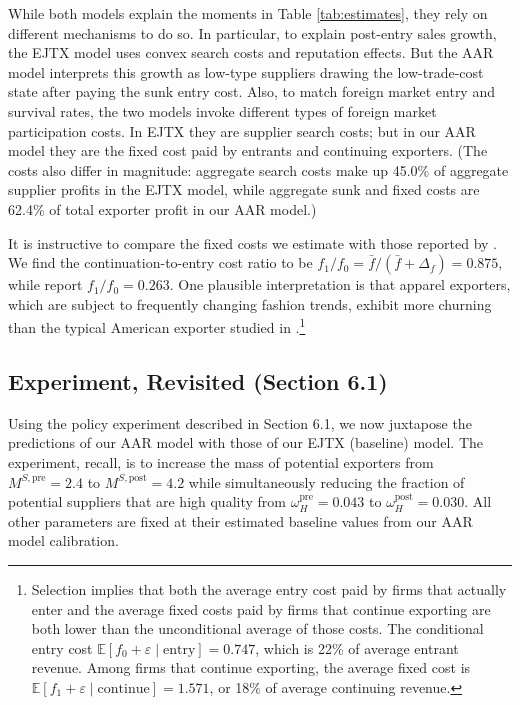 \documentclass[12pt]{article} \usepackage{amsmath,amssymb,amsthm,geometry,graphicx,setspace,algorithm,algpseudocode,float}
\begin{document}
While both models explain the moments in Table \ref{tab:estimates}, they rely on different mechanisms to do so. In particular, to explain post-entry sales growth, the EJTX model uses convex search costs and reputation effects. But the AAR model interprets this growth as low-type suppliers  drawing the low-trade-cost state after paying the sunk entry cost.
Also, to match foreign market entry and survival rates, the two models invoke different types of foreign market participation costs. 
 In EJTX they are supplier search costs; but in our AAR model they are the fixed cost paid by entrants and continuing exporters.  
(The costs also differ in magnitude: aggregate search costs make up 45.0\% of aggregate supplier profits in the EJTX model, while aggregate sunk and fixed costs are 62.4\% of total exporter profit in our AAR model.) 

 It is instructive to compare the fixed costs we estimate with those reported by \citet{AlessandriaArkolakisRuhl2020}. We find the continuation-to-entry cost ratio to be $f_1/f_0 = \bar f/(\bar f+\Delta_f)=0.875$, while \citet{AlessandriaArkolakisRuhl2020} report $f_1/f_0=0.263$. One plausible interpretation is that apparel exporters, which are subject to frequently changing fashion trends, exhibit more churning than the typical American exporter studied in \citet{AlessandriaArkolakisRuhl2020}.\footnote{Selection implies that both the average entry cost paid by firms that actually enter and the average fixed costs paid by firms that continue exporting are both lower than the unconditional average of those costs.  The conditional entry cost $\mathbb{E}[f_0+\varepsilon \mid \text{entry}] = 0.747$, which is 22\% of average entrant revenue. Among firms that continue exporting, the average fixed cost is $\mathbb{E}[f_1+\varepsilon \mid \text{continue}] = 1.571$, or 18\% of average continuing revenue.} 

\subsection{Experiment, Revisited (Section 6.1)}
Using the policy experiment described in Section 6.1, we now juxtapose the predictions of our AAR model with those of our EJTX (baseline) model. The experiment, recall, is to increase the mass of potential exporters from $M^{S,\text{pre}} = 2.4$ to $M^{S,\text{post}} = 4.2$ while simultaneously reducing the fraction of potential suppliers that are high quality from $\omega_H^{\text{pre}} = 0.043$ to $\omega_H^{\text{post}} = 0.030$. All other parameters are fixed at their estimated baseline values from our AAR model calibration. 
\end{document}
